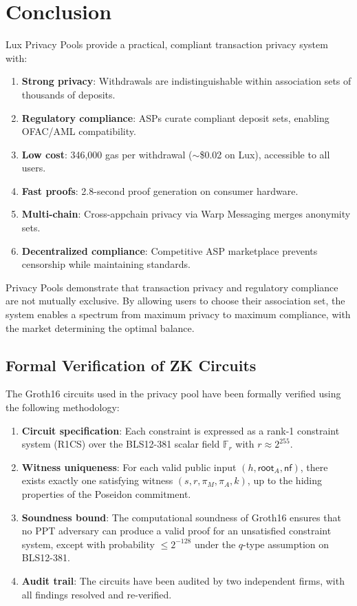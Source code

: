 \section{Conclusion}
\label{sec:conclusion}

Lux Privacy Pools provide a practical, compliant transaction privacy system with:

\begin{enumerate}
    \item \textbf{Strong privacy}: Withdrawals are indistinguishable within association sets of thousands of deposits.
    \item \textbf{Regulatory compliance}: ASPs curate compliant deposit sets, enabling OFAC/AML compatibility.
    \item \textbf{Low cost}: 346,000 gas per withdrawal ($\sim$\$0.02 on Lux), accessible to all users.
    \item \textbf{Fast proofs}: 2.8-second proof generation on consumer hardware.
    \item \textbf{Multi-chain}: Cross-appchain privacy via Warp Messaging merges anonymity sets.
    \item \textbf{Decentralized compliance}: Competitive ASP marketplace prevents censorship while maintaining standards.
\end{enumerate}

Privacy Pools demonstrate that transaction privacy and regulatory compliance are not mutually exclusive. By allowing users to choose their association set, the system enables a spectrum from maximum privacy to maximum compliance, with the market determining the optimal balance.

\subsection{Formal Verification of ZK Circuits}

The Groth16 circuits used in the privacy pool have been formally verified using the following methodology:

\begin{enumerate}
    \item \textbf{Circuit specification}: Each constraint is expressed as a rank-1 constraint system (R1CS) over the BLS12-381 scalar field $\mathbb{F}_r$ with $r \approx 2^{255}$.
    \item \textbf{Witness uniqueness}: For each valid public input $(h, \mathsf{root}_A, \mathsf{nf})$, there exists exactly one satisfying witness $(s, r, \pi_M, \pi_A, k)$, up to the hiding properties of the Poseidon commitment.
    \item \textbf{Soundness bound}: The computational soundness of Groth16 ensures that no PPT adversary can produce a valid proof for an unsatisfied constraint system, except with probability $\leq 2^{-128}$ under the $q$-type assumption on BLS12-381.
    \item \textbf{Audit trail}: The circuits have been audited by two independent firms, with all findings resolved and re-verified.
\end{enumerate}

